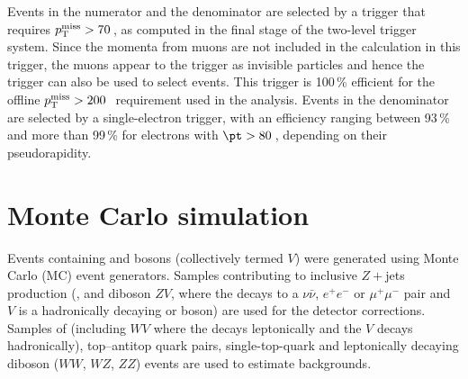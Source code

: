 \documentclass[cernpreprint,txfonts,UKenglish,texlive=2016]{\ATLASLATEXPATH atlasdoc}
\begin{document}
Events in the numerator and the \mumu{} denominator are selected by
a trigger that requires $p_\mathrm{T}^\mathrm{miss} > 70$\,\GeV, as computed in
the final stage of the two-level trigger system. %
Since the momenta from muons are not included in the \ptmiss{}
calculation in this trigger, the muons appear to the trigger as invisible particles 
and hence the trigger can also be used to select \mumu{} events.
This trigger is 100\,\% efficient for the offline $p_\mathrm{T}^\mathrm{miss} > 200$\,\GeV\ requirement used in the analysis. Events in
the \ee{} denominator are selected by a single-electron trigger, 
with an efficiency ranging between 93\,\% and more than 99\,\% for 
electrons with $\pt>80$\,\GeV, depending on their pseudorapidity.


\section{Monte Carlo simulation}
\label{sec:MC}
Events containing \Z{} and \W{} bosons (collectively termed $V$) were generated using Monte Carlo (MC) event generators.
Samples contributing to inclusive $Z+$jets production (\Znunu{}, \Zgll{} and diboson $ZV$, where the \Z{} decays to
a $\nu\bar{\nu}$, $e^+e^-$ or $\mu^+\mu^-$ pair and $V$ is a hadronically decaying \W{} or \Z{} boson)
are used for the detector corrections. 
Samples of \Wlnu{} (including $WV$ where the \W{} decays leptonically
and the $V$ decays hadronically),
top--antitop quark pairs, single-top-quark and leptonically decaying diboson ($WW$, $WZ$, $ZZ$) events are
used to estimate backgrounds.
\end{document}
